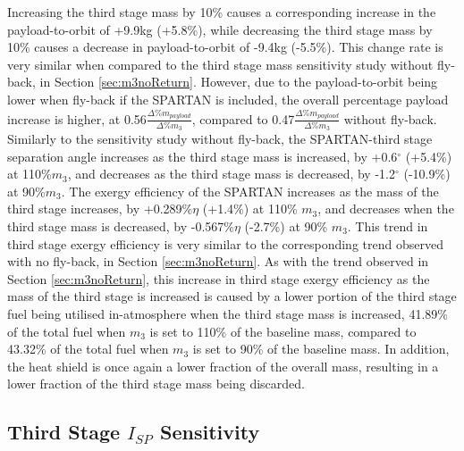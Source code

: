 Increasing the third stage mass by 10\% causes a corresponding increase in the payload-to-orbit of +9.9kg (+5.8\%), while decreasing the third stage mass by 10\% causes a decrease in payload-to-orbit of -9.4kg (-5.5\%). 
This change rate is very similar when compared to the third stage mass sensitivity study without fly-back, in Section \ref{sec:m3noReturn}. However, due to the payload-to-orbit being lower when fly-back if the SPARTAN is included, the overall percentage payload increase is higher, at 0.56$\frac{\Delta\%m_{payload}}{\Delta\%m_3}$, compared to 0.47$\frac{\Delta\%m_{payload}}{\Delta\%m_3}$ without fly-back. 
Similarly to the sensitivity study without fly-back, the SPARTAN-third stage separation angle increases as the third stage mass is increased, by +0.6$^\circ$ (+5.4\%) at 110\%$m_3$, and decreases as the third stage mass is decreased, by -1.2$^\circ$ (-10.9\%) at 90\%$m_3$. 
The exergy efficiency of the SPARTAN increases as the mass of the third stage increases, by +0.289\%$\eta$ (+1.4\%) at 110\% $m_3$, and decreases when the third stage mass is decreased, by -0.567\%$\eta$ (-2.7\%) at 90\% $m_3$.
This trend in third stage exergy efficiency is very similar to the corresponding trend observed with no fly-back, in Section \ref{sec:m3noReturn}.
As with the trend observed in Section \ref{sec:m3noReturn}, this increase in third stage exergy efficiency as the mass of the third stage is increased is caused by a lower portion of the third stage fuel being utilised in-atmosphere when the third stage mass is increased, 41.89\% of the total fuel when $m_3$ is set to 110\% of the baseline mass, compared to 43.32\% of the total fuel when $m_3$ is set to 90\% of the baseline mass. 
In addition, the heat shield is once again a lower fraction of the overall mass, resulting in a lower fraction of the third stage mass being discarded. 

\subsection{Third Stage $I_{SP}$ Sensitivity}

